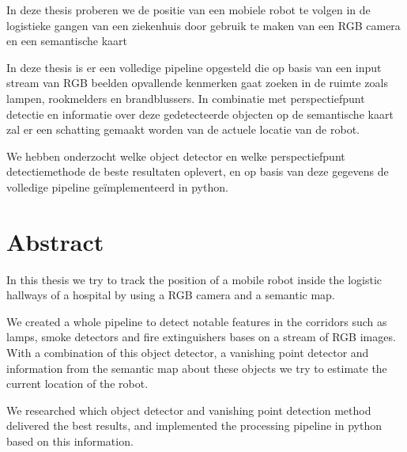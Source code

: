 In deze thesis proberen we de positie van een mobiele robot te volgen in de logistieke gangen van een ziekenhuis door gebruik te maken van een RGB camera en een semantische kaart

In deze thesis is er een volledige pipeline opgesteld die op basis van een input stream van RGB beelden opvallende kenmerken
gaat zoeken in de ruimte zoals lampen, rookmelders en brandblussers.
In combinatie met perspectiefpunt detectie en informatie over deze gedetecteerde objecten op de semantische kaart zal er een
schatting gemaakt worden van de actuele locatie van de robot.

We hebben onderzocht welke object detector en welke perspectiefpunt detectiemethode de beste resultaten oplevert, en op basis van
deze gegevens de volledige pipeline ge\"{i}mplementeerd in python.


\pagebreak
\chapter*{Abstract}

In this thesis we try to track the position of a mobile robot inside the logistic hallways of a hospital by using a RGB camera and a semantic map.

We created a whole pipeline to detect notable features in the corridors such as lamps, smoke detectors and fire extinguishers bases on a stream of RGB images.
With a combination of this object detector, a vanishing point detector and information from the semantic map about these objects we try to estimate
the current location of the robot.

We researched which object detector and vanishing point detection method delivered the best results, and implemented the processing pipeline
in python based on this information.
